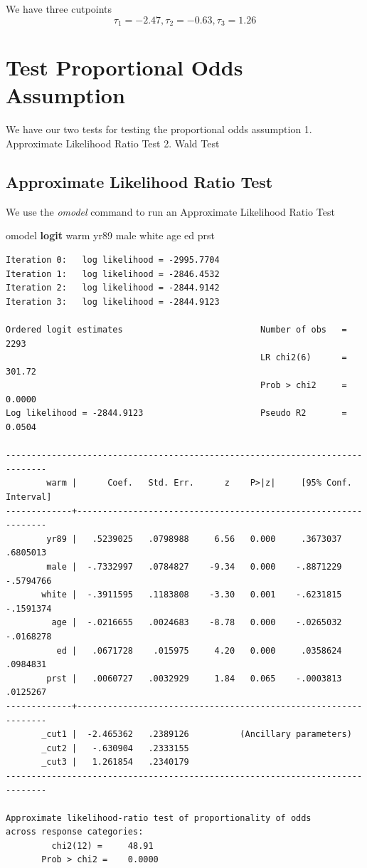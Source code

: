 \documentclass[
]{book}
\newenvironment{Shaded}{\begin{snugshade}}{\end{snugshade}}
\newcommand{\BaseNTok}[1]{\textcolor[rgb]{0.00,0.00,0.81}{#1}}
\newcommand{\KeywordTok}[1]{\textcolor[rgb]{0.13,0.29,0.53}{\textbf{#1}}}
\newcommand{\NormalTok}[1]{#1}
\begin{document}
We have three cutpoints \[ \tau_1 = -2.47, \tau_2 = -0.63, \tau_3 = 1.26 \]

\section{Test Proportional Odds Assumption}\label{test-proportional-odds-assumption}

We have our two tests for testing the proportional odds assumption
1. Approximate Likelihood Ratio Test
2. Wald Test

\subsection{Approximate Likelihood Ratio Test}\label{approximate-likelihood-ratio-test}

We use the \emph{omodel} command to run an Approximate Likelihood Ratio Test

\begin{Shaded}
\begin{Highlighting}[]
\NormalTok{omodel }\KeywordTok{logit}\NormalTok{ warm yr89 male }\BaseNTok{white}\NormalTok{ age ed prst}
\end{Highlighting}
\end{Shaded}

\begin{verbatim}
Iteration 0:   log likelihood = -2995.7704
Iteration 1:   log likelihood = -2846.4532
Iteration 2:   log likelihood = -2844.9142
Iteration 3:   log likelihood = -2844.9123

Ordered logit estimates                           Number of obs   =       2293
                                                  LR chi2(6)      =     301.72
                                                  Prob > chi2     =     0.0000
Log likelihood = -2844.9123                       Pseudo R2       =     0.0504

------------------------------------------------------------------------------
        warm |      Coef.   Std. Err.      z    P>|z|     [95% Conf. Interval]
-------------+----------------------------------------------------------------
        yr89 |   .5239025   .0798988     6.56   0.000     .3673037    .6805013
        male |  -.7332997   .0784827    -9.34   0.000    -.8871229   -.5794766
       white |  -.3911595   .1183808    -3.30   0.001    -.6231815   -.1591374
         age |  -.0216655   .0024683    -8.78   0.000    -.0265032   -.0168278
          ed |   .0671728    .015975     4.20   0.000     .0358624    .0984831
        prst |   .0060727   .0032929     1.84   0.065    -.0003813    .0125267
-------------+----------------------------------------------------------------
       _cut1 |  -2.465362   .2389126          (Ancillary parameters)
       _cut2 |   -.630904   .2333155 
       _cut3 |   1.261854   .2340179 
------------------------------------------------------------------------------

Approximate likelihood-ratio test of proportionality of odds
across response categories:
         chi2(12) =     48.91
       Prob > chi2 =    0.0000
\end{verbatim}
\end{document}
